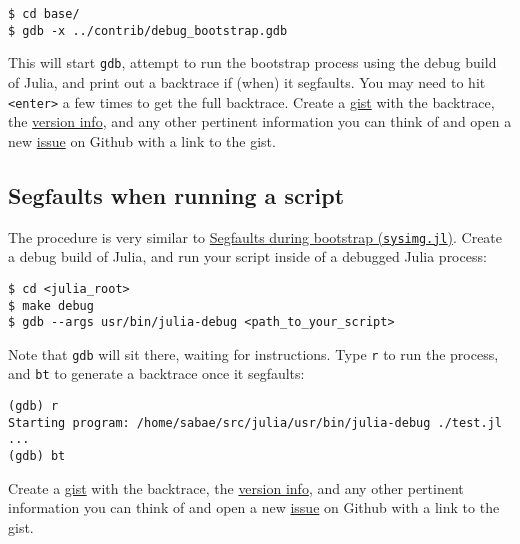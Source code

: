 \begin{lstlisting}
$ cd base/
$ gdb -x ../contrib/debug_bootstrap.gdb
\end{lstlisting}



This will start \texttt{gdb}, attempt to run the bootstrap process using the debug build of Julia, and print out a backtrace if (when) it segfaults.  You may need to hit \texttt{<enter>} a few times to get the full backtrace.  Create a \href{https://gist.github.com}{gist} with the backtrace, the \hyperlink{4601189142062189569}{version info}, and any other pertinent information you can think of and open a new \href{https://github.com/JuliaLang/julia/issues?q=is\%3Aopen}{issue} on Github with a link to the gist.



\hypertarget{17337880191991868567}{}


\subsection{Segfaults when running a script}



The procedure is very similar to \hyperlink{13671941627037387928}{Segfaults during bootstrap (\texttt{sysimg.jl})}.  Create a debug build of Julia, and run your script inside of a debugged Julia process:




\begin{lstlisting}
$ cd <julia_root>
$ make debug
$ gdb --args usr/bin/julia-debug <path_to_your_script>
\end{lstlisting}



Note that \texttt{gdb} will sit there, waiting for instructions.  Type \texttt{r} to run the process, and \texttt{bt} to generate a backtrace once it segfaults:




\begin{lstlisting}
(gdb) r
Starting program: /home/sabae/src/julia/usr/bin/julia-debug ./test.jl
...
(gdb) bt
\end{lstlisting}



Create a \href{https://gist.github.com}{gist} with the backtrace, the \hyperlink{4601189142062189569}{version info}, and any other pertinent information you can think of and open a new \href{https://github.com/JuliaLang/julia/issues?q=is\%3Aopen}{issue} on Github with a link to the gist.



